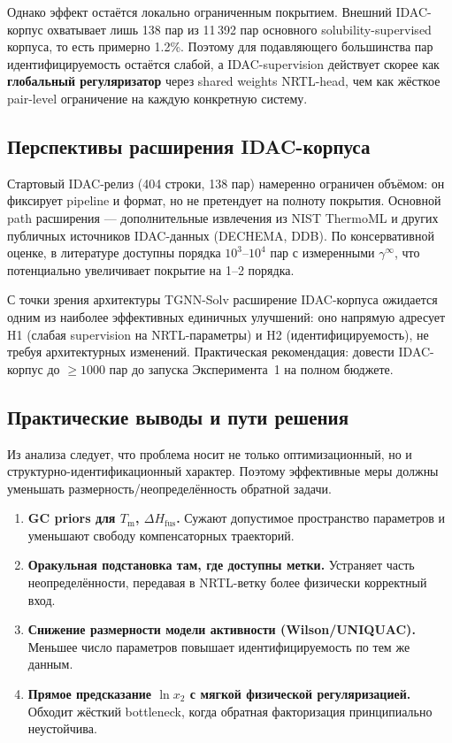 \documentclass[11pt]{article}
\begin{document}
Однако эффект остаётся локально ограниченным покрытием. Внешний IDAC-корпус охватывает лишь 138 пар из 11\,392 пар основного solubility-supervised корпуса, то есть примерно 1.2\%. Поэтому для подавляющего большинства пар идентифицируемость остаётся слабой, а IDAC-supervision действует скорее как \textbf{глобальный регуляризатор} через shared weights NRTL-head, чем как жёсткое pair-level ограничение на каждую конкретную систему.

\subsection{Перспективы расширения IDAC-корпуса}

Стартовый IDAC-релиз (404 строки, 138 пар) намеренно ограничен объёмом: он фиксирует pipeline и формат, но не претендует на полноту покрытия. Основной path расширения --- дополнительные извлечения из NIST ThermoML и других публичных источников IDAC-данных (DECHEMA, DDB). По консервативной оценке, в литературе доступны порядка $10^3$--$10^4$ пар с измеренными $\gamma^\infty$, что потенциально увеличивает покрытие на 1--2 порядка.

С точки зрения архитектуры TGNN-Solv расширение IDAC-корпуса ожидается одним из наиболее эффективных единичных улучшений: оно напрямую адресует H1 (слабая supervision на NRTL-параметры) и H2 (идентифицируемость), не требуя архитектурных изменений. Практическая рекомендация: довести IDAC-корпус до $\geq 1000$ пар до запуска Эксперимента~1 на полном бюджете.

\subsection{Практические выводы и пути решения}

Из анализа следует, что проблема носит не только оптимизационный, но и структурно-идентификационный характер. Поэтому эффективные меры должны уменьшать размерность/неопределённость обратной задачи.

\begin{enumerate}
  \item \textbf{GC priors для $T_{\mathrm{m}}$, $\Delta H_{\mathrm{fus}}$.} Сужают допустимое пространство параметров и уменьшают свободу компенсаторных траекторий.
  \item \textbf{Оракульная подстановка там, где доступны метки.} Устраняет часть неопределённости, передавая в NRTL-ветку более физически корректный вход.
  \item \textbf{Снижение размерности модели активности (Wilson/UNIQUAC).} Меньшее число параметров повышает идентифицируемость по тем же данным.
  \item \textbf{Прямое предсказание $\ln x_2$ с мягкой физической регуляризацией.} Обходит жёсткий bottleneck, когда обратная факторизация принципиально неустойчива.
\end{enumerate}
\end{document}
